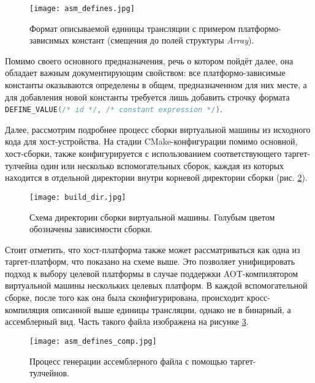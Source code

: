 \begin{figure}[H]
    \centering
    \texttt{[image: asm\_defines.jpg]}
    \caption{Формат описываемой единицы трансляции с примером платформо-зависимых констант (смещения до полей структуры \textit{Array}).}
    \label{fig:asm_defines}
\end{figure}

Помимо своего основного предназначения, речь о котором пойдёт далее, она обладает важным документирующим свойством: все платформо-зависимые константы оказываются определены в общем, предназначенном для них месте, а для добавления новой константы требуется лишь добавить строчку формата \lstinline[language=c++, keywordstyle=\color{myred}, keywordstyle=\bfseries\color{myred}, basicstyle=\color{blue}, commentstyle = \ttfamily\color{mygr}, morekeywords={*, DEFINE_VALUE}, breaklines=true, backgroundcolor=\color{gray}]{DEFINE_VALUE(/* id */, /* constant expression */)}.
\par
Далее, рассмотрим подробнее процесс сборки виртуальной машины из исходного кода для хост-устройства.
На стадии CMake-конфигурации помимо основной, хост-сборки, также конфигурируется с использованием соответствующего таргет-тулчейна один или несколько вспомогательных сборок, каждая из которых находится в отдельной директории внутри корневой директории сборки (рис. \ref{fig:build_dir}).

\begin{figure}[H]
    \centering
    \texttt{[image: build\_dir.jpg]}
    \caption{Схема директории сборки виртуальной машины. Голубым цветом обозначены зависимости сборки.}
    \label{fig:build_dir}
\end{figure}

Стоит отметить, что хост-платформа также может рассматриваться как одна из таргет-платформ, что показано на схеме выше.
Это позволяет унифицировать подход к выбору целевой платформы в случае поддержки AOT-компилятором виртуальной машины нескольких целевых платформ.
В каждой вспомогательной сборке, после того как она была сконфигурирована, происходит кросс-компиляция описанной выше единицы трансляции, однако не в бинарный, а ассемблерный вид. Часть такого файла изображена на рисунке \ref{fig:asm_defines_comp}.

\begin{figure}[H]
    \centering
    \texttt{[image: asm\_defines\_comp.jpg]}
    \caption{Процесс генерации ассемблерного файла с помощью таргет-тулчейнов.}
    \label{fig:asm_defines_comp}
\end{figure}

